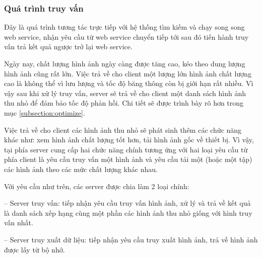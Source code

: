 \subsubsection{Quá trình truy vấn}
\label{subsubsection:truyvan_server}
Đây là quá trình tương tác trực tiếp với hệ thống tìm kiếm và chạy song song web service, nhận yêu cầu từ web service chuyển tiếp tới sau đó tiến hành truy vấn trả kết quả ngược trở lại web service.

Ngày nay, chất lượng hình ảnh ngày càng được tăng cao, kéo theo dung lượng hình ảnh cũng rất lớn. Việc trả về cho client một lượng lớn hình ảnh chất lượng cao là không thể vì lưu lượng và tốc độ băng thông còn bị giới hạn rất nhiều. Vì vậy sau khi xử lý truy vấn, server sẽ trả về cho client một danh sách hình ảnh thu nhỏ để đảm bảo tốc độ phản hồi. Chi tiết sẽ được trình bày rõ hơn trong mục \ref{subsection:optimize}.

Việc trả về cho client các hình ảnh thu nhỏ sẽ phát sinh thêm các chức năng khác như: xem hình ảnh chất lượng tốt hơn, tải hình ảnh gốc về thiết bị. Vì vậy, tại phía server cung cấp hai chức năng chính tương ứng với hai loại yêu cầu từ phía client là yêu cầu truy vấn một hình ảnh và yêu cầu tải một (hoặc một tập) các hình ảnh theo các mức chất lượng khác nhau.

Với yêu cầu như trên, các server được chia làm 2 loại chính:

-- Server truy vấn: tiếp nhận yêu cầu truy vấn hình ảnh, xử lý và trả về kết quả là danh sách xếp hạng cùng một phần các hình ảnh thu nhỏ giống với hình truy vấn nhất.

-- Server truy xuất dữ liệu: tiếp nhận yêu cầu truy xuất hình ảnh, trả về hình ảnh được lấy từ bộ nhớ.

